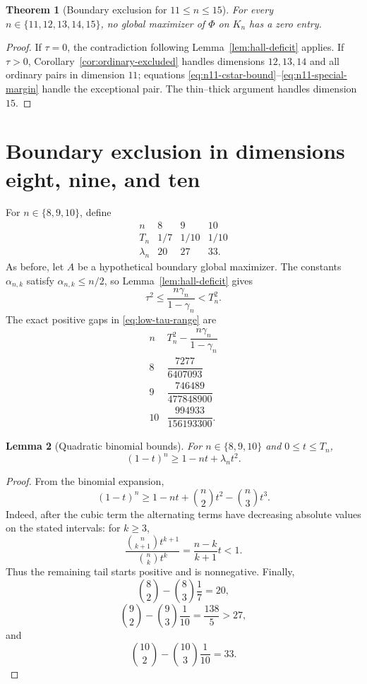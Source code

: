 \documentclass[11pt]{article}
\newtheorem{theorem}{Theorem}[section]
\newtheorem{lemma}[theorem]{Lemma}
\theoremstyle{definition}
\newcommand{\1}{\mathbf{1}}
\begin{document}
\begin{theorem}[Boundary exclusion for $11\le n\le15$]\label{thm:boundary-mid-high}
For every $n\in\{11,12,13,14,15\}$, no global maximizer of $\Phi$ on $K_n$ has a zero entry.
\end{theorem}

\begin{proof}
If $\tau=0$, the contradiction following Lemma~\ref{lem:hall-deficit} applies.  If $\tau>0$, Corollary~\ref{cor:ordinary-excluded} handles dimensions $12,13,14$ and all ordinary pairs in dimension $11$; equations \eqref{eq:n11-cstar-bound}--\eqref{eq:n11-special-margin} handle the exceptional pair.  The thin--thick argument handles dimension $15$.
\end{proof}

\section{Boundary exclusion in dimensions eight, nine, and ten}\label{sec:low}

For $n\in\{8,9,10\}$, define
\[
\begin{array}{c|ccc}
 n&8&9&10\\ \hline
 T_n&1/7&1/10&1/10\\
 \lambda_n&20&27&33.
\end{array}
\tag{7.1}\label{eq:low-parameters}
\]
As before, let $A$ be a hypothetical boundary global maximizer.  The constants $\alpha_{n,k}$ satisfy $\alpha_{n,k}\le n/2$, so Lemma~\ref{lem:hall-deficit} gives
\[
 \tau^2\le\frac{n\gamma_n}{1-\gamma_n}<T_n^2.
 \tag{7.2}\label{eq:low-tau-range}
\]
The exact positive gaps in \eqref{eq:low-tau-range} are
\[
\begin{array}{c|c}
 n&T_n^2-\dfrac{n\gamma_n}{1-\gamma_n}\\ \hline
 8&\dfrac{7277}{6407093}\\[2mm]
 9&\dfrac{746489}{477848900}\\[2mm]
 10&\dfrac{994933}{156193300}.
\end{array}
\tag{7.3}\label{eq:tau-range-gaps}
\]

\begin{lemma}[Quadratic binomial bounds]\label{lem:binomial-low}
For $n\in\{8,9,10\}$ and $0\le t\le T_n$,
\[
 (1-t)^n\ge1-nt+\lambda_nt^2.
 \tag{7.4}\label{eq:low-binomial}
\]
\end{lemma}

\begin{proof}
From the binomial expansion,
\[
 (1-t)^n
 \ge1-nt+\binom n2t^2-\binom n3t^3.
\]
Indeed, after the cubic term the alternating terms have decreasing absolute values on the stated intervals: for $k\ge3$,
\[
 \frac{\binom n{k+1}t^{k+1}}{\binom nk t^k}
 =\frac{n-k}{k+1}t<1.
\]
Thus the remaining tail starts positive and is nonnegative.  Finally,
\[
 \binom82-\binom83\frac17=20,
\]
\[
 \binom92-\binom93\frac1{10}=\frac{138}{5}>27,
\]
and
\[
 \binom{10}2-\binom{10}3\frac1{10}=33.
\]
\end{proof}
\end{document}
